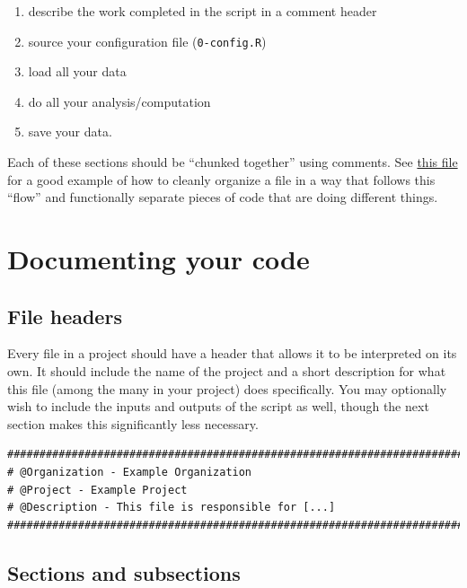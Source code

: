 \documentclass[
]{book}
\providecommand{\tightlist}{%
  \setlength{\itemsep}{0pt}\setlength{\parskip}{0pt}}
\begin{document}
\begin{enumerate}
\def\labelenumi{\arabic{enumi}.}
\tightlist
\item
  describe the work completed in the script in a comment header
\item
  source your configuration file (\texttt{0-config.R})
\item
  load all your data
\item
  do all your analysis/computation
\item
  save your data.
\end{enumerate}

Each of these sections should be ``chunked together'' using comments. See \href{https://github.com/kmishra9/Flu-Absenteeism/blob/master/Master's\%20Thesis\%20-\%20Spatial\%20Epidemiology\%20of\%20Influenza/2a\%20-\%20Statistical-Inputs.R}{this file} for a good example of how to cleanly organize a file in a way that follows this ``flow'' and functionally separate pieces of code that are doing different things.

\section{Documenting your code}\label{documenting-your-code}

\subsection{File headers}\label{file-headers}

Every file in a project should have a header that allows it to be interpreted on its own. It should include the name of the project and a short description for what this file (among the many in your project) does specifically. You may optionally wish to include the inputs and outputs of the script as well, though the next section makes this significantly less necessary.

\begin{verbatim}
################################################################################
# @Organization - Example Organization
# @Project - Example Project
# @Description - This file is responsible for [...]
################################################################################
\end{verbatim}

\subsection{Sections and subsections}\label{sections-and-subsections}
\end{document}
